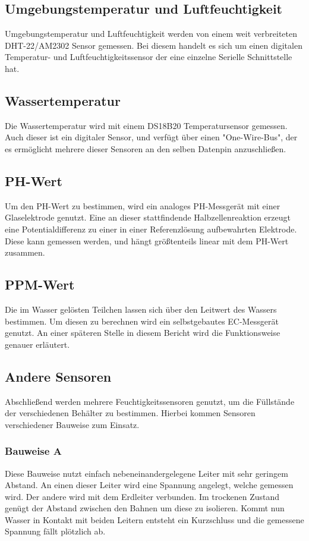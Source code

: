 \documentclass{report}
\begin{document}
\subsection{Umgebungstemperatur und Luftfeuchtigkeit}
Umgebungstemperatur und Luftfeuchtigkeit werden von einem weit verbreiteten DHT-22/AM2302 Sensor gemessen. Bei diesem handelt es sich um einen digitalen Temperatur- und Luftfeuchtigkeitssensor der eine einzelne Serielle Schnittstelle hat.
\subsection{Wassertemperatur}
Die Wassertemperatur wird mit einem DS18B20 Temperatursensor gemessen. Auch dieser ist ein digitaler Sensor, und verfügt über einen "One-Wire-Bus", der es ermöglicht mehrere dieser Sensoren an den selben Datenpin anzuschließen.
\subsection{PH-Wert}
Um den PH-Wert zu bestimmen, wird ein analoges PH-Messgerät mit einer Glaselektrode genutzt. Eine an dieser stattfindende Halbzellenreaktion erzeugt eine Potentialdifferenz zu einer in einer Referenzlösung aufbewahrten Elektrode. Diese kann gemessen werden, und hängt größtenteils linear mit dem PH-Wert zusammen.
\subsection{PPM-Wert}
Die im Wasser gelösten Teilchen lassen sich über den Leitwert des Wassers bestimmen. Um diesen zu berechnen wird ein selbstgebautes EC-Messgerät genutzt. An einer späteren Stelle in diesem Bericht wird die Funktionsweise genauer erläutert.
\subsection{Andere Sensoren}
Abschließend werden mehrere Feuchtigkeitssensoren genutzt, um die Füllstände der verschiedenen Behälter zu bestimmen. Hierbei kommen Sensoren verschiedener Bauweise zum Einsatz. 
\subsubsection{Bauweise A}
Diese Bauweise nutzt einfach nebeneinandergelegene Leiter mit sehr geringem Abstand. An einen dieser Leiter wird eine Spannung angelegt, welche gemessen wird. Der andere wird mit dem Erdleiter verbunden. Im trockenen Zustand genügt der Abstand zwischen den Bahnen um diese zu isolieren. Kommt nun Wasser in Kontakt mit beiden Leitern entsteht ein Kurzschluss und die gemessene Spannung fällt plötzlich ab.
\end{document}
